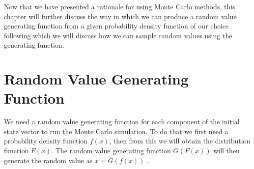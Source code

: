 Now that we have presented a rationale for using Monte Carlo methods, this chapter will further discuss the way in which we can produce a random value generating function from a given probability density function of our choice following which we will discuss how we can sample random values using the generating function.

\section{Random Value Generating Function}
We need a random value generating function for each component of the initial state vector to run the Monte Carlo simulation. To do that we first need a probability density function $f(x)$, then from this we will obtain the distribution function $F(x)$. The random value generating function $G(F(x))$ will then generate the random value as $x = G(f(x))$ \cite{monteweb}.

